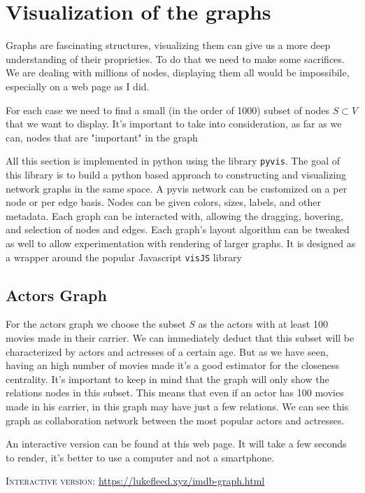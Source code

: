 \section{Visualization of the graphs}
Graphs are fascinating structures, visualizing them can give us a more deep understanding of their proprieties. To do that we need to make some sacrifices. We are dealing with millions of nodes, displaying them all would be impossibile, especially on a web page as I did. \s

\nd For each case we need to find a small (in the order of 1000) subset of nodes $S \subset V$ that we want to display. It's important to take into consideration, as far as we can, nodes that are "important" in the graph \s

\nd All this section is implemented in python using the library \texttt{pyvis}. The goal of this library is to build a python based approach to constructing and visualizing network graphs in the same space. A pyvis network can be customized on a per node or per edge basis. Nodes can be given colors, sizes, labels, and other metadata. Each graph can be interacted with, allowing the dragging, hovering, and selection of nodes and edges. Each graph's layout algorithm can be tweaked as well to allow experimentation with rendering of larger graphs. It is designed as a wrapper around the popular Javascript \texttt{visJS} library

\subsection{Actors Graph}
For the actors graph we choose the subset $S$ as the actors with at least 100 movies made in their carrier. We can immediately deduct that this subset will be characterized by actors and actresses of a certain age. But as we have seen, having an high number of movies made it's a good estimator for the closeness centrality. It's important to keep in mind that the graph will only show the relations nodes in this subset. This means that even if an actor has 100 movies made in his carrier, in this graph may have just a few relations. We can see this graph as collaboration network between the most popular actors and actresses. \s

\nd An interactive version can be found at this web page. It will take a few seconds to render, it's better to use a computer and not a smartphone. \s

\textsc{Interactive version}: \url{https://lukefleed.xyz/imdb-graph.html}

